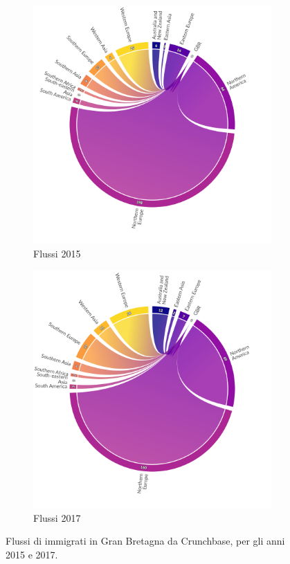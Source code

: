 \begin{figure}[!h]
    \centering
    \begin{subfigure}{0.47\textwidth}
        \raggedleft         
        \includegraphics[scale=0.34]{images/SVG/Chords/Brexit/togbrflows_2015.png}
        \caption{Flussi 2015}
        \label{fig:togbr_flowsBrexit2015}
    \end{subfigure}
    \begin{subfigure}{0.47\textwidth}
        \raggedleft         
        \includegraphics[scale=0.34]{images/SVG/Chords/Brexit/togbrflows_2017.png}
        \caption{Flussi 2017}
        \label{fig:togbr_flowsBrexit2017}
    \end{subfigure}
    \caption{Flussi di immigrati in Gran Bretagna da Crunchbase, per gli anni 2015 e 2017.}
    \label{fig:togbr_flowsBrexit}
\end{figure}


